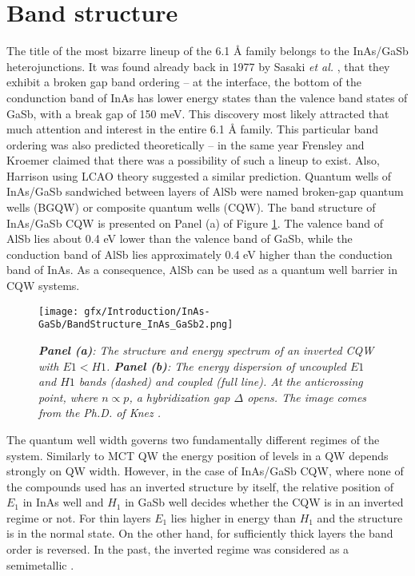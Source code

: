 \documentclass[titlepage,a4paper]{book}
\newcommand{\wciecie}{\quad\phantom{v}}
\begin{document}
\section{Band structure}
\wciecie
The title of the most bizarre lineup of the 6.1 Å family belongs to the InAs/GaSb heterojunctions. It was found already back in 1977 by Sasaki \textit{et al.} \cite{Sasaki_BandOrdering}, that they exhibit a broken gap band ordering -- at the interface, the bottom of the condunction band of InAs has lower energy states than the valence band states of GaSb, with a break gap of 150 meV. This discovery most likely attracted that much attention and interest in the entire 6.1 Å family. This particular band ordering was also predicted theoretically -- in the same year Frensley and Kroemer \cite{Frensley_BandOrdering} claimed that there was a possibility of such a lineup to exist. Also, Harrison using LCAO theory \cite{Harrison_BandOrdering} suggested a similar prediction. Quantum wells of InAs/GaSb sandwiched between layers of AlSb were named broken-gap quantum wells (BGQW) or composite quantum wells (CQW). The band structure of InAs/GaSb CQW is presented on Panel (a) of Figure \ref{fig:BandStructure_InAs_GaSb2}. The valence band of AlSb lies about 0.4 eV lower than the valence band of GaSb, while the conduction band of AlSb lies approximately 0.4 eV higher than the conduction band of InAs. As a consequence, AlSb can be used as a quantum well barrier in CQW systems.

\begin{figure}[ht]
	\centering
	\texttt{[image: gfx/Introduction/InAs-GaSb/BandStructure\_InAs\_GaSb2.png]}
	\vspace{-10pt}
	\caption{\textit{\textbf{Panel (a)}: The structure and energy spectrum of an inverted CQW with $E1 < H1$. \textbf{Panel (b)}: The energy dispersion of uncoupled $E1$ and $H1$ bands (dashed) and coupled (full line). At the anticrossing point, where $n \propto p$, a hybridization gap $\Delta$ opens. The image comes from the Ph.D. of Knez \cite{Knez_phd}.}}
	\label{fig:BandStructure_InAs_GaSb2}
\end{figure} 

The quantum well width governs two fundamentally different regimes of the system. Similarly to MCT QW the energy position of levels in a QW depends strongly on QW width. However, in the case of InAs/GaSb CQW, where none of the compounds used has an inverted structure by itself, the relative position of $E_1$ in InAs well and $H_1$ in GaSb well decides whether the CQW is in an inverted regime or not. For thin layers $E_1$ lies higher in energy than $H_1$ and the structure is in the normal state. On the other hand, for sufficiently thick layers the band order is reversed. In the past, the inverted regime was considered as a semimetallic \cite{Chang_BandStructure}. 
\end{document}
